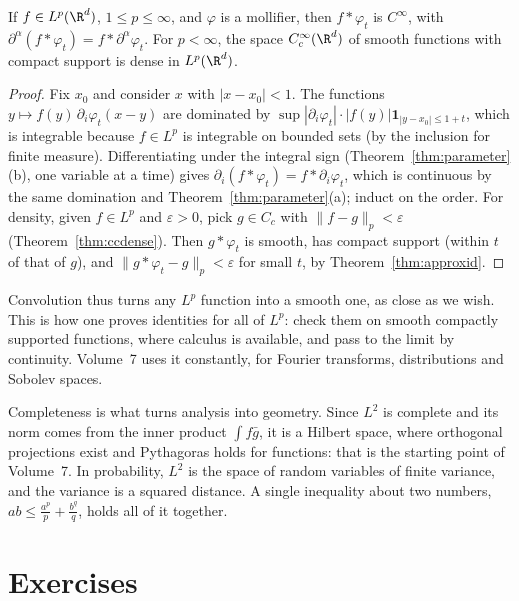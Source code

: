 \begin{theorem}\label{thm:smoothdense}
If $f\in L^p(\R^d)$, $1\le p\le\infty$, and $\varphi$ is a mollifier, then $f*\varphi_t$ is $C^\infty$, with $\partial^\alpha(f*\varphi_t)=f*\partial^\alpha\varphi_t$. For $p<\infty$, the space $C_c^\infty(\R^d)$ of smooth functions
with compact support is dense in $L^p(\R^d)$.
\end{theorem}
\begin{proof}
Fix $x_0$ and consider $x$ with $|x-x_0|<1$. The functions $y\mapsto f(y)\,\partial_i\varphi_t(x-y)$ are dominated by $\sup|\partial_i\varphi_t|\cdot|f(y)|\mathbf 1_{|y-x_0|\le1+t}$, which is integrable because $f\in L^p$ is
integrable on bounded sets (by the inclusion for finite measure). Differentiating under the integral sign (Theorem~\ref{thm:parameter}(b), one variable at a time) gives
$\partial_i(f*\varphi_t)=f*\partial_i\varphi_t$, which is continuous by the same domination and Theorem~\ref{thm:parameter}(a); induct on the order. For density, given $f\in L^p$ and $\varepsilon>0$, pick $g\in C_c$ with
$\|f-g\|_p<\varepsilon$ (Theorem~\ref{thm:ccdense}). Then $g*\varphi_t$ is smooth, has compact support (within $t$ of that of $g$), and $\|g*\varphi_t-g\|_p<\varepsilon$ for small $t$, by Theorem~\ref{thm:approxid}.
\end{proof}

Convolution thus turns any $L^p$ function into a smooth one, as close as we wish. This is how one proves identities for all of $L^p$: check them on smooth compactly supported functions, where
calculus is available, and pass to the limit by continuity. Volume~7 uses it constantly, for Fourier transforms, distributions and Sobolev spaces.

\begin{beauty}
Completeness is what turns analysis into geometry. Since $L^2$ is complete and its norm comes from the inner product $\int f\bar g$, it is a Hilbert space, where orthogonal projections exist and
Pythagoras holds for functions: that is the starting point of Volume~7. In probability, $L^2$ is the space of random variables of finite variance, and the variance is a squared distance. A
single inequality about two numbers, $ab\le\frac{a^p}p+\frac{b^q}q$, holds all of it together.
\end{beauty}

\section{Exercises}

